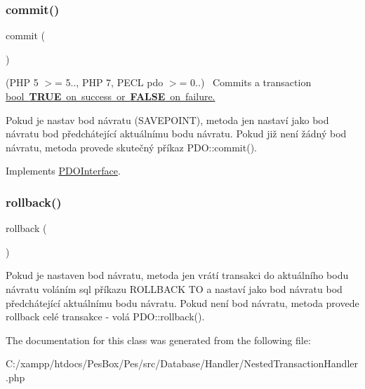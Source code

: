 \subsubsection{\texorpdfstring{commit()}{commit()}}
{\footnotesize\ttfamily commit (\begin{DoxyParamCaption}{ }\end{DoxyParamCaption})}

(P\+HP 5 $>$= 5.., P\+HP 7, P\+E\+CL pdo $>$= 0..)~\newline
 Commits a transaction \mbox{\hyperlink{}{bool {\bfseries T\+R\+UE} on success or {\bfseries F\+A\+L\+SE} on failure.}}

Pokud je nastav bod návratu (S\+A\+V\+E\+P\+O\+I\+NT), metoda jen nastaví jako bod návratu bod předchátející aktuálnímu bodu návratu. Pokud již není žádný bod návratu, metoda provede skutečný příkaz P\+D\+O\+::commit(). 

Implements \mbox{\hyperlink{interface_pes_1_1_database_1_1_handler_1_1_p_d_o_interface_af5674c27d4a92f6228565010eacbb9cb}{P\+D\+O\+Interface}}.

\mbox{\label{class_pes_1_1_database_1_1_handler_1_1_nested_transaction_handler_afa549adf79e3f8c09fe8f903dd5fbfa7}} 
\subsubsection{\texorpdfstring{rollback()}{rollback()}}
{\footnotesize\ttfamily rollback (\begin{DoxyParamCaption}{ }\end{DoxyParamCaption})}

Pokud je nastaven bod návratu, metoda jen vrátí transakci do aktuálního bodu návratu voláním sql příkazu R\+O\+L\+L\+B\+A\+CK TO a nastaví jako bod návratu bod předchátející aktuálnímu bodu návratu. Pokud není bod návratu, metoda provede rollback celé transakce -\/ volá P\+D\+O\+::rollback(). 

The documentation for this class was generated from the following file\+:\begin{DoxyCompactItemize}
\item 
C\+:/xampp/htdocs/\+Pes\+Box/\+Pes/src/\+Database/\+Handler/Nested\+Transaction\+Handler.\+php\end{DoxyCompactItemize}
